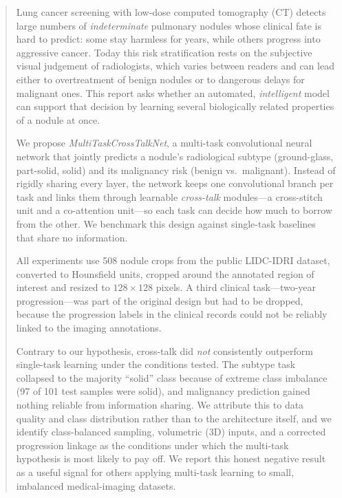 \begin{abstract}
\noindent
Lung cancer screening with low-dose computed tomography (CT) detects large
numbers of \emph{indeterminate} pulmonary nodules whose clinical fate is hard
to predict: some stay harmless for years, while others progress into aggressive
cancer. Today this risk stratification rests on the subjective visual judgement
of radiologists, which varies between readers and can lead either to
overtreatment of benign nodules or to dangerous delays for malignant ones. This
report asks whether an automated, \emph{intelligent} model can support that
decision by learning several biologically related properties of a nodule at
once.

\noindent
We propose \textit{MultiTaskCrossTalkNet}, a multi-task convolutional neural
network that jointly predicts a nodule's radiological subtype (ground-glass,
part-solid, solid) and its malignancy risk (benign vs.\ malignant). Instead of
rigidly sharing every layer, the network keeps one convolutional branch per task
and links them through learnable \emph{cross-talk} modules---a cross-stitch unit
and a co-attention unit---so each task can decide how much to borrow from the
other. We benchmark this design against single-task baselines that share no
information.

\noindent
All experiments use 508 nodule crops from the public LIDC-IDRI dataset,
converted to Hounsfield units, cropped around the annotated region of interest
and resized to $128\times128$ pixels. A third clinical task---two-year
progression---was part of the original design but had to be dropped, because the
progression labels in the clinical records could not be reliably linked to the
imaging annotations.

\noindent
Contrary to our hypothesis, cross-talk did \emph{not} consistently outperform
single-task learning under the conditions tested. The subtype task collapsed to
the majority ``solid'' class because of extreme class imbalance (97 of 101 test
samples were solid), and malignancy prediction gained nothing reliable from
information sharing. We attribute this to data quality and class distribution
rather than to the architecture itself, and we identify class-balanced sampling,
volumetric (3D) inputs, and a corrected progression linkage as the conditions
under which the multi-task hypothesis is most likely to pay off. We report this
honest negative result as a useful signal for others applying multi-task
learning to small, imbalanced medical-imaging datasets.

\end{abstract}